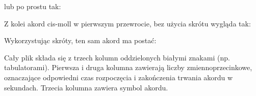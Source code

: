 \begin{center}
\end{center}
lub po prostu tak:
\begin{center}
\end{center}
Z kolei akord cis-moll w pierwszym przewrocie, bez użycia skrótu wygląda tak:
\begin{center}
\end{center}
Wykorzystując skróty, ten sam akord ma postać:
\begin{center}
\end{center}
Cały plik  składa się z trzech kolumn oddzielonych białymi znakami (np. tabulatorami).  Pierwsza i druga kolumna zawierają liczby zmiennoprzecinkowe, oznaczające odpowiedni czas rozpoczęcia i zakończenia trwania akordu w sekundach. Trzecia kolumna zawiera symbol akordu.

